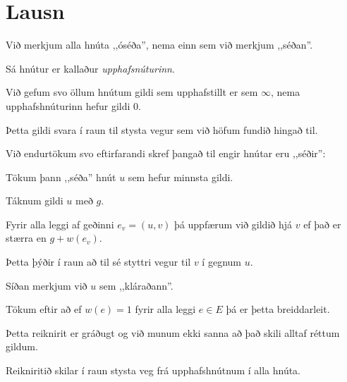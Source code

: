 \section{Lausn}
{
    {
        \item<1-> Við merkjum alla hnúta ,,óséða'', nema einn sem við merkjum ,,séðan''.
        \item<2-> Sá hnútur er kallaður \emph{upphafsnúturinn}.
        \item<3-> Við gefum svo öllum hnútum gildi sem upphafstillt er sem $\infty$, nema upphafshnúturinn hefur gildi $0$.
        \item<4-> Þetta gildi svara í raun til stysta vegur sem við höfum fundið hingað til.
        \item<5-> Við endurtökum svo eftirfarandi skref þangað til engir hnútar eru ,,séðir'':
        {
            \item<6-> Tökum þann ,,séða'' hnút $u$ sem hefur minnsta gildi.
            \item<7-> Táknum gildi $u$ með $g$.
            \item<8-> Fyrir alla leggi af geðinni $e_v = (u, v)$ þá uppfærum við gildið hjá $v$ ef það er stærra en $g + w(e_v)$.
            \item<9-> Þetta þýðir í raun að til sé styttri vegur til $v$ í gegnum $u$.
            \item<10-> Síðan merkjum við $u$ sem ,,kláraðann''.
        }
    }
}

{
    {
        \item<1-> Tökum eftir að ef $w(e) = 1$ fyrir alla leggi $e \in E$ þá er þetta breiddarleit.
        \item<2-> Þetta reiknirit er gráðugt og við munum ekki sanna að það skili alltaf réttum gildum.
        \item<3-> Reikniritið skilar í raun stysta veg frá upphafshnútnum í alla hnúta.
    }
}

